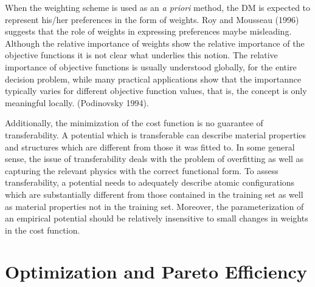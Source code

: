 When the weighting scheme is used as an \emph{a priori} method, the DM is expected to represent his/her preferences in the form of weights.  Roy and Mousseau (1996) suggests that the role of weights in expressing preferences maybe misleading.  Although the relative importance of weights show the relative importance of the objective functions it is not clear what underlies this notion.  The relative importance of objective functions is usually understood globally, for the entire decision problem, while many practical applications show that the importannce typically varies for different objective function values, that is, the concept is only meaningful locally. (Podinovsky 1994).

Additionally, the minimization of the cost function is no guarantee of transferability.  A potential which is transferable can describe material properties and structures which are different from those it was fitted to.  In some general sense, the issue of transferability deals with the problem of overfitting as well as capturing the relevant physics with the correct functional form.  To assess transferability, a potential needs to adequately describe atomic configurations which are substantially different from those contained in the training set as well as material properties not in the training set.  Moreover, the parameterization of an empirical potential should be relatively insensitive to small changes in weights in the cost function.

\section{Optimization and Pareto Efficiency}

